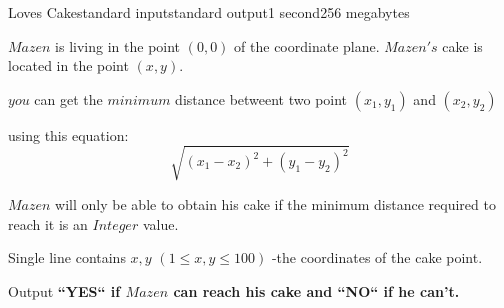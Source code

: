 \begin{problem}{Loves Cake}{standard input}{standard output}{1 second}{256 megabytes}

$Mazen$ is living in the point $(0,0)$ of the coordinate plane. $Mazen's$ cake is located in the point $(x,y)$.

$you$ can get the $minimum$ distance betweent two point $(x_1,y_1)$ and $(x_2,y_2)$

using this equation:
$$ \sqrt{(x_1 - x_2)^2+(y_1-y_2)^2}$$

$Mazen$ will only be able to obtain his cake if the minimum distance required to reach it is an \large{$Integer$} value.

\InputFile
Single line contains $x,y$ $(1 \le x,y \le 100)$ -the coordinates of the cake point. 

\OutputFile
Output \bf{``YES``} if $Mazen$ can reach his cake and \bf{``NO``} if he can't.

\Examples

\begin{example}
%
%
\end{example}

\end{problem}

